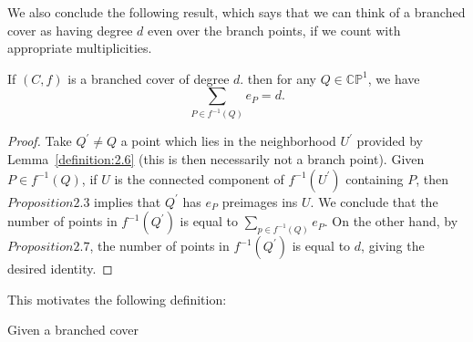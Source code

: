\documentclass{article}
\begin{document}
We also conclude the following result, which says that we can think of a branched cover as having degree $d$ even over the branch points, if we count with appropriate multiplicities.
\begin{corollary}
  If $(C,f)$ is a branched cover of degree $d$. then for any $Q \in \mathbb{CP}^{1}$, we have \begin{displaymath}
    \sum_{P \in f^{-1}(Q)}e_{P}=d.
\end{displaymath}
\end{corollary}
\begin{proof}
  Take $Q^{'} \neq Q$ a point which lies in the neighborhood $U^{'}$ provided by Lemma~\ref{definition:2.6} (this is then necessarily not a branch point). Given $P \in f^{-1}(Q)$, if $U$ is the connected component of $f^{-1}(U^{'})$ containing $P$, then $Proposition 2.3$ implies that $Q^{'}$ has $e_{P}$ preimages ins $U$. We conclude that the number of points in $f^{-1}(Q^{'})$ is equal to $\sum_{p \in f^{-1}(Q)}e_{P}$. On the other hand, by $Proposition 2.7$, the number of points in $f^{-1}(Q^{'})$ is equal to $d$, giving the desired identity.
\end{proof}
This motivates the following definition:
\begin{definition}
  Given a branched cover
\end{definition}
\end{document}
